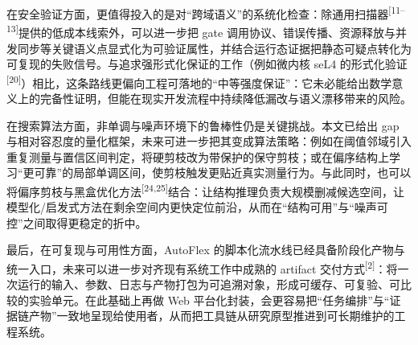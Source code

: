 \documentclass[UTF8,a4paper,12pt]{ctexart}
\numberwithin{equation}{section}
\begin{document}
在安全验证方面，更值得投入的是对``跨域语义''的系统化检查：除通用扫描器\textsuperscript{[11--13]}提供的低成本线索外，可以进一步把 gate 调用协议、错误传播、资源释放与并发同步等关键语义点显式化为可验证属性，并结合运行态证据把静态可疑点转化为可复现的失败信号。与追求强形式化保证的工作（例如微内核 seL4 的形式化验证\textsuperscript{[20]}）相比，这条路线更偏向工程可落地的``中等强度保证''：它未必能给出数学意义上的完备性证明，但能在现实开发流程中持续降低漏改与语义漂移带来的风险。

在搜索算法方面，非单调与噪声环境下的鲁棒性仍是关键挑战。本文已给出 gap 与相对容忍度的量化框架，未来可进一步把其变成算法策略：例如在阈值邻域引入重复测量与置信区间判定，将硬剪枝改为带保护的保守剪枝；或在偏序结构上学习``更可靠''的局部单调区间，使剪枝触发更贴近真实测量行为。与此同时，也可以将偏序剪枝与黑盒优化方法\textsuperscript{[24,25]}结合：让结构推理负责大规模删减候选空间，让模型化/启发式方法在剩余空间内更快定位前沿，从而在``结构可用''与``噪声可控''之间取得更稳定的折中。

最后，在可复现与可用性方面，AutoFlex 的脚本化流水线已经具备阶段化产物与统一入口，未来可以进一步对齐现有系统工作中成熟的 artifact 交付方式\textsuperscript{[2]}：将一次运行的输入、参数、日志与产物打包为可追溯对象，形成可缓存、可复验、可比较的实验单元。在此基础上再做 Web 平台化封装，会更容易把``任务编排''与``证据链产物''一致地呈现给使用者，从而把工具链从研究原型推进到可长期维护的工程系统。


\newpage
{}

{}
\renewcommand\refname{参考文献}
\end{document}
